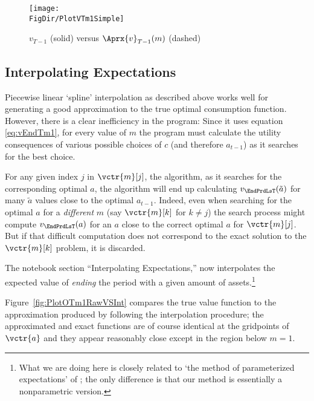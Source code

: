 \documentclass[titlepage, headings=optiontotocandhead]{Resources/texmf-local/tex/latex/econtex}
\begin{document}
\hypertarget{PlotvTm1Simple}{}
\begin{figure}
  \centerline{\texttt{[image: \\FigDir/PlotVTm1Simple]}}
  \caption{$v_{T-1}$ (solid) versus $\Aprx{v}_{T-1}(m)$ (dashed)}
  \label{fig:PlotVTm1Simple}
\end{figure}


\hypertarget{interpolating-expectations}{}
\subsection{Interpolating Expectations}


Piecewise linear `spline' interpolation as described above works well for generating a good approximation to the true optimal consumption function. However, there is a clear inefficiency in the program: Since it uses equation \eqref{eq:vEndTm1}, for every value of $m$ the program must calculate the utility consequences of various possible choices of $c$ (and therefore $a_{t-1}$) as it searches for the best choice.

For any given index $j$ in $\vctr{m}[j]$, the algorithm, as it searches for the corresponding optimal $a$, the algorithm will end up  calculating $v_{\EndPrdLsT}(\tilde{a})$ for many $\tilde{a}$ values close to the optimal $a_{t-1}$.  Indeed, even when searching for the optimal $a$ for a \emph{different} $m$ (say $\vctr{m}[k]$ for $k \neq j$) the search process might compute $v_{\EndPrdLsT}(a)$ for an $a$ close to the correct optimal $a$ for $\vctr{m}[j]$. But if that difficult computation does not correspond to the exact solution to the $\vctr{m}[k]$ problem, it is discarded.  


The notebook section ``Interpolating Expectations,'' now interpolates the expected value of \textit{ending} the period with a given amount of assets.\footnote{What we are doing here is closely related to `the method of parameterized expectations' of \cite{denHaanMarcet:parameterized}; the only difference is that our method is essentially a nonparametric version.}  %

Figure~\ref{fig:PlotOTm1RawVSInt} compares the true value function to the approximation produced by following the interpolation procedure; the approximated and exact functions are of course identical at the gridpoints of $\vctr{a}$ and they appear reasonably close except in the region below $m=1$.
\end{document}
